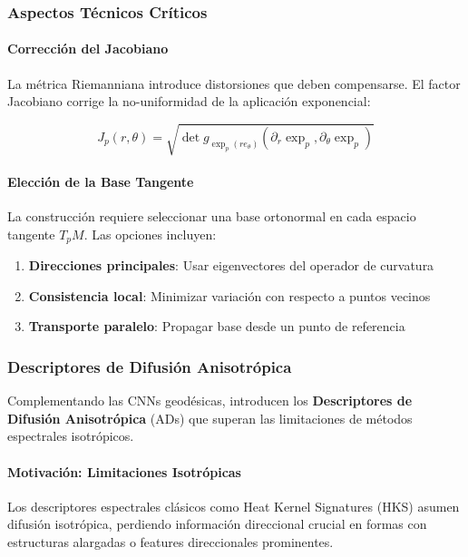 \subsubsection{Aspectos Técnicos Críticos}

\paragraph{Corrección del Jacobiano}

La métrica Riemanniana introduce distorsiones que deben compensarse. El factor Jacobiano corrige la no-uniformidad de la aplicación exponencial:

\begin{equation}
J_p(r, \theta) = \sqrt{\det g_{\exp_p(r e_\theta)}(\partial_r \exp_p, \partial_\theta \exp_p)}
\end{equation}

\paragraph{Elección de la Base Tangente}

La construcción requiere seleccionar una base ortonormal en cada espacio tangente $T_p M$. Las opciones incluyen:
\begin{enumerate}
    \item \textbf{Direcciones principales}: Usar eigenvectores del operador de curvatura
    \item \textbf{Consistencia local}: Minimizar variación con respecto a puntos vecinos
    \item \textbf{Transporte paralelo}: Propagar base desde un punto de referencia
\end{enumerate}

\subsubsection{Descriptores de Difusión Anisotrópica}

Complementando las CNNs geodésicas, \citet{Boscaini2016AnisotropicDD} introducen los \textbf{Descriptores de Difusión Anisotrópica} (ADs) que superan las limitaciones de métodos espectrales isotrópicos.

\paragraph{Motivación: Limitaciones Isotrópicas}

Los descriptores espectrales clásicos como Heat Kernel Signatures (HKS) asumen difusión isotrópica, perdiendo información direccional crucial en formas con estructuras alargadas o features direccionales prominentes.

